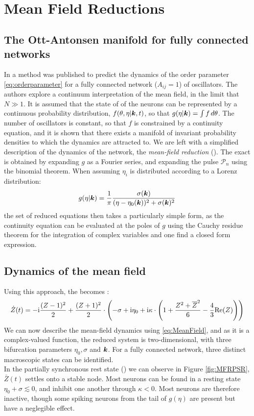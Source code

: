 \newpage
\section{Mean Field Reductions}
\subsection{The Ott-Antonsen manifold for fully connected networks}
In \cite{OttAntonsen2008, OttAntonsen2009, OttAntonsen2010} a method was published to predict the dynamics of the order parameter \eqref{eq:orderparameter} for a fully connected network ($A_{ij} = 1$) of oscillators. The authors explore a continuum interpretation of the mean field, in the limit that  $N \gg 1$. It is assumed that the state of of the neurons can be represented by a continuous probability distribution, $f(\theta, \eta \rvert {\boldsymbol{k}}, t)$, so that $g(\eta \rvert {\boldsymbol{k}}) = \int f \mathop{d\theta}$. The number of oscillators is constant, so that $f$ is constrained by a continuity equation, and it is shown that there exists a manifold of invariant probability densities to which the dynamics are attracted to. We are left with a simplified description of the dynamics of the network, the \textsl{mean-field reduction} (\MFR). The exact \MFR is obtained by expanding $g$ as a Fourier series, and expanding the pulse $\mathcal{P}_n$ using the binomial theorem. When assuming $\eta_i$ is distributed according to a Lorenz distribution:
\begin{align}
g(\eta | {\boldsymbol{k}})=\frac{1}{\pi} \frac{\sigma({\boldsymbol{k}})}{(\eta-\eta_{0}({\boldsymbol{k}}))^{2}+\sigma({\boldsymbol{k}})^{2}} \label{eq:Lorentzpdf}
\end{align}
the set of reduced equations then takes a particularly simple form, as the continuity equation can be evaluated at the poles of $g$ using the Cauchy residue theorem for the integration of complex variables and one find a closed form expression.


\subsection{Dynamics of the mean field}
Using this approach, the \MFR becomes \cite{Luke2013, Martens2020}:
\begin{align}
\dot{Z}(t)= -\ic \frac{(Z-1)^2}{2}+\frac{(Z+1)^2}{2} \cdot \left(-\sigma+ \ic\eta_{0}
+ \ic \kappa \cdot \left(1+\frac{Z^{2} + \overline{Z}^{2} }{6} - \frac{4}{3} \Re(Z)\right)\right) \label{eq:MeanField}
\end{align}
We can now describe the mean-field dynamics using \eqref{eq:MeanField}, and as it is a complex-valued function, the reduced system is two-dimensional, with three bifurcation parameters $\eta_0, \sigma$ and ${\boldsymbol{k}}$. For a fully connected network, three distinct macroscopic states can be identified.\\
In the partially synchronous rest state (\PSR) we can observe in Figure \ref{fig:MFRPSR}, $\bar{Z}(t)$ settles onto a stable node. Most neurons can be found in a resting state $\eta_0 + \sigma \lesssim 0$, and inhibit one another through $\kappa < 0$. Most neurons are therefore inactive, though some spiking neurons from the tail of $g(\eta)$ are present but have a neglegible effect. \\

